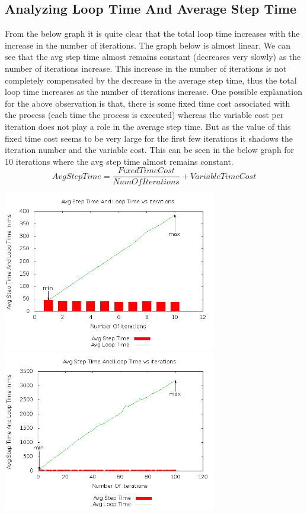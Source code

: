 \documentclass[11pt]{article}
\begin{document}
	\subsection{Analyzing Loop Time And Average Step Time }
	 From the below graph it is quite clear that the total loop time increases with the increase in the number of iterations. The graph below is almost linear. We can see that the avg step time almost remains constant (decreases very slowly) as the number of iterations increase. This increase in the number of iterations is not completely compensated by the decrease in the average step time, thus the total loop time increases as the number of iterations increase. \newline
	One possible explanation for the above observation is that, there is some fixed time cost associated with the process (each time the process is executed) whereas the variable cost per iteration does not play a role in the average step time. But as the value of this fixed time cost seems to be very large for the first few iterations it shadows the iteration number and the variable cost. This can be seen in the below graph for 10 iterations where the avg step time almost remains constant.\newline
\begin{equation*} AvgStepTime = \frac{FixedTimeCost}{NumOfIterations} + VariableTimeCost \end{equation*} \newline

	\begin{center}\includegraphics[height=7cm]{10_10_plot01.png}\includegraphics[height=7cm]{100_30_plot01.png}\end{center}
\end{document}
